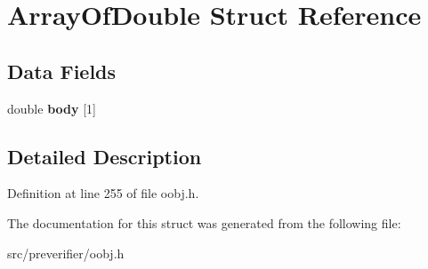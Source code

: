 \section{ArrayOfDouble Struct Reference}
\label{struct_array_of_double}
\subsection*{Data Fields}
\begin{DoxyCompactItemize}
\item 
double {\bfseries body} [1]\label{struct_array_of_double_afef30ed5c5b2961ab77cb941a08bfa8e}

\end{DoxyCompactItemize}


\subsection{Detailed Description}


Definition at line 255 of file oobj.h.



The documentation for this struct was generated from the following file:\begin{DoxyCompactItemize}
\item 
src/preverifier/oobj.h\end{DoxyCompactItemize}
